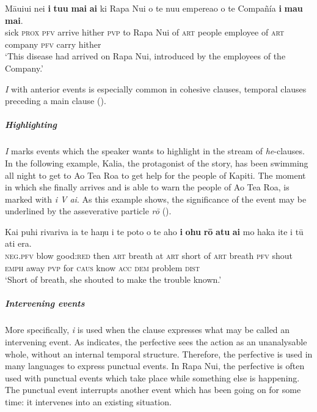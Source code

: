 \ea\label{ex:7.20}
\gll Māuiui nei \textbf{i} \textbf{tu{\ꞌ}u} \textbf{mai} \textbf{ai} ki Rapa Nui o te nu{\ꞌ}u empereao  o te Compañía \textbf{i} \textbf{ma{\ꞌ}u} \textbf{mai}.\\
sick \textsc{prox} \textsc{pfv} arrive hither \textsc{pvp} to Rapa Nui of \textsc{art} people employee  of \textsc{art} company \textsc{pfv} carry hither\\

\glt
‘This disease had arrived on Rapa Nui, introduced by the employees of the Company.’ \textstyleExampleref{[R250.084]} 
\z

\textit{I} with anterior events is especially common in cohesive clauses, temporal clauses preceding a main clause ().

\subparagraph{Highlighting} \textit{I} marks events which the speaker wants to highlight in the stream of \textit{he}{}-clauses. In the following example, Kalia, the protagonist of the story, has been swimming all night to get to Ao Tea Roa to get help for the people of Kapiti. The moment in which she finally arrives and is able to warn the people of Ao Tea Roa, is marked with \textit{i V ai}. As this example shows, the significance of the event may be underlined by the asseverative particle \textit{rō} ().

\ea\label{ex:7.21}
\gll Kai puhi rivariva ia te haŋu {\ꞌ}i te poto o te aho  \textbf{i} \textbf{ohu} \textbf{rō} \textbf{atu} \textbf{ai} mo haka {\ꞌ}ite i tū {\ꞌ}ati era.\\
\textsc{neg.pfv} blow good:\textsc{red} then \textsc{art} breath at \textsc{art} short of \textsc{art} breath  \textsc{pfv} shout \textsc{emph} away \textsc{pvp} for \textsc{caus} know \textsc{acc} \textsc{dem} problem \textsc{dist}\\

\glt 
‘Short of breath, she shouted to make the trouble known.’ \textstyleExampleref{[R347.128]} 
\z

\subparagraph{Intervening events} More specifically, \textit{i} is used when the clause expresses what may be called an intervening event. As \citet[3]{Comrie1976} indicates, the perfective sees the action as an unanalysable whole, without an internal temporal structure. Therefore, the perfective is used in many languages to express punctual events. In Rapa Nui, the perfective is often used with punctual events which take place while something else is happening. The punctual event interrupts another event which has been going on for some time: it intervenes into an existing situation.

